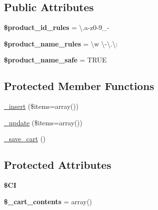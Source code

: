 \subsection*{Public Attributes}
\begin{DoxyCompactItemize}
\item 
\mbox{\label{class_c_i___cart_a7f1862ef4e360c8a0b9d0c690e319c0b}} 
{\bfseries \$product\+\_\+id\+\_\+rules} = \textquotesingle{}\textbackslash{}.a-\/z0-\/9\+\_\+-\/\textquotesingle{}
\item 
\mbox{\label{class_c_i___cart_a69785e82d01638ea5b66f8a43795be31}} 
{\bfseries \$product\+\_\+name\+\_\+rules} = \textquotesingle{}\textbackslash{}w \textbackslash{}-\/\textbackslash{}.\textbackslash{}\+:\textquotesingle{}
\item 
\mbox{\label{class_c_i___cart_ac50c877b5f84615cca770345bdd45c64}} 
{\bfseries \$product\+\_\+name\+\_\+safe} = T\+R\+UE
\end{DoxyCompactItemize}
\subsection*{Protected Member Functions}
\begin{DoxyCompactItemize}
\item 
\mbox{\hyperlink{class_c_i___cart_aef4c24fed660b4f1e088cc5dd6dce6b4}{\+\_\+insert}} (\$items=array())
\item 
\mbox{\hyperlink{class_c_i___cart_ad32aea31bd1348ef53d495d63f72569a}{\+\_\+update}} (\$items=array())
\item 
\mbox{\hyperlink{class_c_i___cart_a75d067fee3c0af4a956eb80f3224a4e4}{\+\_\+save\+\_\+cart}} ()
\end{DoxyCompactItemize}
\subsection*{Protected Attributes}
\begin{DoxyCompactItemize}
\item 
\mbox{\label{class_c_i___cart_a858abd3a8c1e1cf9fef92c84751c5434}} 
{\bfseries \$\+CI}
\item 
\mbox{\label{class_c_i___cart_a3cdc1924ea99edf61cfe8c9e06782f41}} 
{\bfseries \$\+\_\+cart\+\_\+contents} = array()
\end{DoxyCompactItemize}


